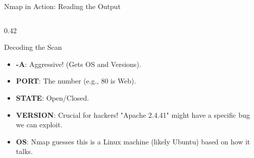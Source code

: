 \documentclass[aspectratio=169]{beamer}  %
\begin{document}
\begin{frame}[fragile]{Nmap in Action: Reading the Output}
\begin{columns}[T]
\begin{column}{0.42\textwidth}
            \begin{block}{Decoding the Scan}
                \footnotesize
                \begin{itemize}
                    \item \textbf{-A}: Aggressive! (Gets OS and Versions).
                    \item \textbf{PORT}: The number (e.g., 80 is Web).
                    \item \textbf{STATE}: Open/Closed.
                    \item \textbf{VERSION}: Crucial for hackers! "Apache 2.4.41" might have a specific bug we can exploit.
                    \item \textbf{OS}: Nmap guesses this is a Linux machine (likely Ubuntu) based on how it talks.
                \end{itemize}
            \end{block}
        \end{column}
    \end{columns}
\end{frame}
\end{document}
